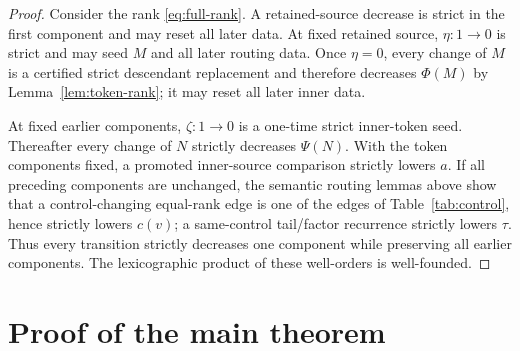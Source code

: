 \documentclass[11pt]{article}
\begin{document}
\begin{proof}
Consider the rank \eqref{eq:full-rank}. A retained-source decrease is strict in
the first component and may reset all later data. At fixed retained source,
$\eta:1\to0$ is strict and may seed $M$ and all later routing data. Once
$\eta=0$, every change of $M$ is a certified strict descendant replacement
and therefore decreases $\Phi(M)$ by Lemma~\ref{lem:token-rank}; it may reset
all later inner data.

At fixed earlier components, $\zeta:1\to0$ is a one-time strict inner-token
seed. Thereafter every change of $N$ strictly decreases $\Psi(N)$. With the
token components fixed, a promoted inner-source comparison strictly lowers
$a$. If all preceding components are unchanged, the semantic routing lemmas
above show that a control-changing equal-rank edge is one of the edges of
Table~\ref{tab:control}, hence strictly lowers $c(v)$; a same-control
tail/factor recurrence strictly lowers $\tau$. Thus every transition
strictly decreases one component while preserving all earlier components.
The lexicographic product of these well-orders is well-founded.
\end{proof}

\section{Proof of the main theorem}
\end{document}
